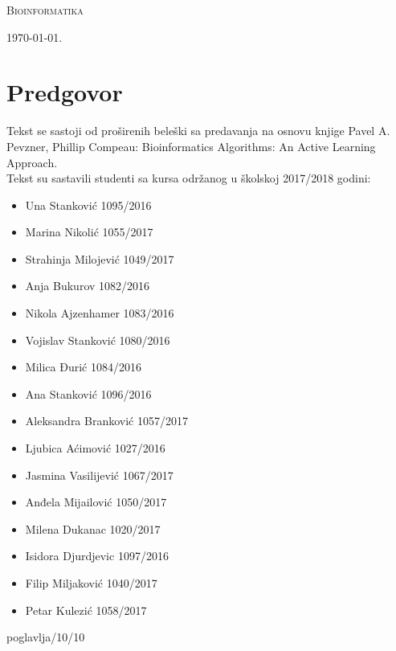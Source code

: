 \documentclass[a4paper]{book}
\begin{document}
\begin{titlepage}
	\vspace*{0.4\textheight}
	
	\begin{center}
		{\Huge \textsc{Bioinformatika}}
	\end{center}
	
	\vfill
	
	\begin{center}
		{\Large \today.}
	\end{center}
\end{titlepage}

\blankpage

\frontmatter
\tableofcontents
\blankpage

\chapter*{Predgovor}
Tekst se sastoji od proširenih beleški sa predavanja na osnovu knjige Pavel A. Pevzner, Phillip Compeau: Bioinformatics Algorithms: An Active Learning Approach. \\Tekst su sastavili studenti sa kursa održanog u školskoj 2017/2018 godini: 
\begin{itemize}
	\item Una Stanković 1095/2016
	\item Marina Nikolić 1055/2017
	\item Strahinja Milojević 1049/2017
	\item Anja Bukurov 1082/2016
	\item Nikola Ajzenhamer 1083/2016
	\item Vojislav Stanković 1080/2016
	\item Milica Đurić 1084/2016
	\item Ana Stanković 1096/2016
	\item Aleksandra Branković 1057/2017
	\item Ljubica Aćimović 1027/2016
	\item Jasmina Vasilijević 1067/2017
	\item Anđela Mijailović 1050/2017
	\item Milena Dukanac 1020/2017
	\item Isidora Djurdjevic 1097/2016
	\item Filip Miljaković 1040/2017
	\item Petar Kulezić 1058/2017
\end{itemize}

\mainmatter








 {poglavlja/10/10}


\backmatter
\renewcommand{\bibname}{Literatura}

\begingroup
\raggedright

\endgroup


\end{document}
